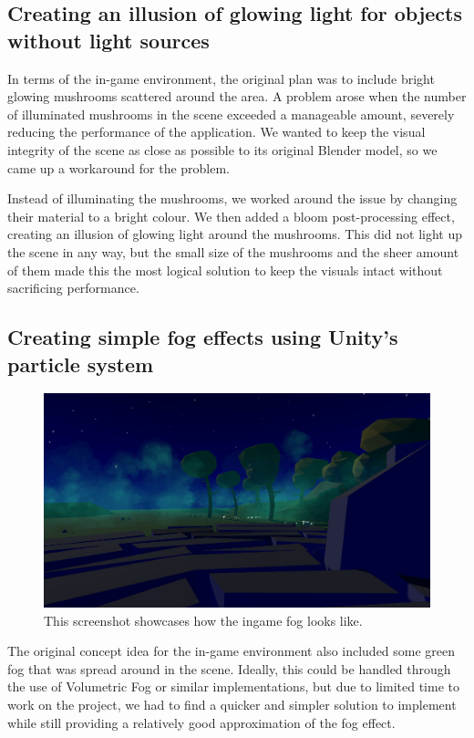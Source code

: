 \subsection{Creating an illusion of glowing light for objects without light sources}
In terms of the in-game environment, the original plan was to include bright glowing mushrooms scattered around the area. A problem arose when the number of illuminated mushrooms in the scene exceeded a manageable amount, severely reducing the performance of the application. We wanted to keep the visual integrity of the scene as close as possible to its original Blender model, so we came up a workaround for the problem.

Instead of illuminating the mushrooms, we worked around the issue by changing their material to a bright colour. We then added a bloom post-processing effect, creating an illusion of glowing light around the mushrooms. This did not light up the scene in any way, but the small size of the mushrooms and the sheer amount of them made this the most logical solution to keep the visuals intact without sacrificing performance. 

\subsection{Creating simple fog effects using Unity's particle system}
\begin{figure}[tbph]
    \centering
    \includegraphics[width=1.0\textwidth]{images/fog}
    \caption[Screenshot of ingame fog]{This screenshot showcases how the ingame fog looks like.}
    \label{fig:fog}
\end{figure}
The original concept idea for the in-game environment also included some green fog that was spread around in the scene. Ideally, this could be handled through the use of Volumetric Fog or similar implementations, but due to limited time to work on the project, we had to find a quicker and simpler solution to implement while still providing a relatively good approximation of the fog effect. 

